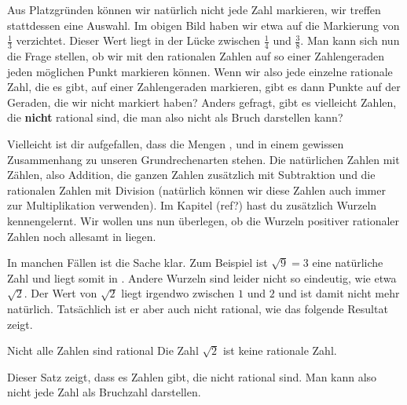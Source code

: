 \documentclass[../../main.tex]{subfiles}
\begin{document}
	 Aus Platzgründen können wir natürlich nicht jede Zahl markieren, wir treffen stattdessen eine Auswahl. Im obigen Bild haben wir etwa auf die Markierung von $\frac{1}{3}$ verzichtet. Dieser Wert liegt in der Lücke zwischen $\frac{1}{4}$ und $\frac{3}{8}$. Man kann sich nun die Frage stellen, ob wir mit den rationalen Zahlen auf so einer Zahlengeraden jeden möglichen Punkt markieren können. Wenn wir also jede einzelne rationale Zahl, die es gibt, auf einer Zahlengeraden markieren, gibt es dann Punkte auf der Geraden, die wir nicht markiert haben? Anders gefragt, gibt es vielleicht Zahlen, die \textbf{nicht} rational sind, die man also nicht als Bruch darstellen kann? 

	Vielleicht ist dir aufgefallen, dass die Mengen \Natural, \Integer und \Rational in einem gewissen Zusammenhang zu unseren Grundrechenarten stehen. Die natürlichen Zahlen mit Zählen, also Addition, die ganzen Zahlen zusätzlich mit Subtraktion und die rationalen Zahlen mit Division (natürlich können wir diese Zahlen auch immer zur Multiplikation verwenden). Im Kapitel (ref?) hast du zusätzlich Wurzeln kennengelernt. Wir wollen uns nun überlegen, ob die Wurzeln positiver rationaler Zahlen noch allesamt in \Rational liegen.	
	
	In manchen Fällen ist die Sache klar. Zum Beispiel ist $\sqrt{9}=3$ eine natürliche Zahl und liegt somit in \Rational. Andere Wurzeln sind leider nicht so eindeutig, wie etwa $\sqrt{2}$. Der Wert von $\sqrt{2}$ liegt irgendwo zwischen $1$ und $2$ und ist damit nicht mehr natürlich. Tatsächlich ist er aber auch nicht rational, wie das folgende Resultat zeigt.
	
	\begin{theorem}{Nicht alle Zahlen sind rational}
		Die Zahl $\sqrt{2}$ ist keine rationale Zahl.
	\end{theorem}
	
	Dieser Satz zeigt, dass es Zahlen gibt, die nicht rational sind. Man kann also nicht jede Zahl als Bruchzahl darstellen.
	
\end{document}
